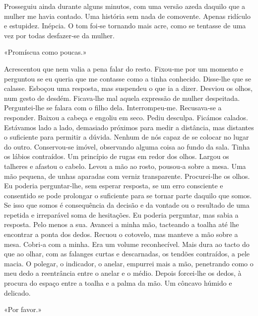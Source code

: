 Prosseguiu ainda durante alguns minutos, com uma versão azeda daquilo
que a mulher me havia contado. Uma história sem nada de comovente.
Apenas ridículo e estupidez. Inépcia. O tom foi­‑se tornando mais acre,
como se tentasse de uma vez por todas desfazer­‑se da mulher.

«Promíscua como poucas.»

Acrescentou que nem valia a pena falar do resto. Fixou­‑me por um
momento e perguntou se eu queria que me contasse como a tinha conhecido.
Disse­‑lhe que se calasse. Esboçou uma resposta, mas suspendeu o que ia
a dizer. Desviou os olhos, num gesto de desdém. Ficava­‑lhe mal aquela
expressão de mulher despeitada. Perguntei­‑lhe se falara com o filho
dela. Interrompeu­‑me. Recusava­‑se a responder. Baixou a cabeça e
engoliu em seco. Pediu desculpa. Ficámos calados. Estávamos lado a lado,
demasiado próximos para medir a distância, mas distantes o suficiente
para permitir a dúvida. Nenhum de nós capaz de se colocar no lugar do
outro. Conservou­‑se imóvel, observando alguma coisa ao fundo da sala.
Tinha os lábios contraídos. Um princípio de rugas em redor dos olhos.
Largou os talheres e afastou o cabelo. Levou a mão ao rosto, pousou­‑a
sobre a mesa. Uma mão pequena, de unhas aparadas com verniz
transparente. Procurei­‑lhe os olhos. Eu poderia perguntar­‑lhe, sem
esperar resposta, se um erro consciente e consentido se pode prolongar o
suficiente para se tornar parte daquilo que somos. Se isso que somos é
consequência da decisão e da vontade ou o resultado de uma repetida e
irreparável soma de hesitações. Eu poderia perguntar, mas sabia a
resposta. Pelo menos a sua. Avancei a minha mão, tacteando a toalha até
lhe encontrar a ponta dos dedos. Recuou o cotovelo, mas manteve a mão
sobre a mesa. Cobri­‑a com a minha. Era um volume reconhecível. Mais
dura ao tacto do que ao olhar, com as falanges curtas e descarnadas, os
tendões contraídos, a pele macia. O polegar, o indicador, o anelar,
empurrei mais a mão, penetrando como o meu dedo a reentrância entre o
anelar e o médio. Depois forcei­‑lhe os dedos, à procura do espaço entre
a toalha e a palma da mão. Um côncavo húmido e delicado.

«Por favor.»

